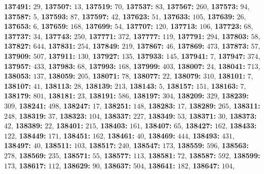 \textsf{\bfseries 137491:} $29$, \textsf{\bfseries 137507:} $13$, \textsf{\bfseries 137519:} $70$, \textsf{\bfseries 137537:} $83$, \textsf{\bfseries 137567:} $260$, \textsf{\bfseries 137573:} $94$, \textsf{\bfseries 137587:} $5$, \textsf{\bfseries 137593:} $87$, \textsf{\bfseries 137597:} $42$, \textsf{\bfseries 137623:} $51$, \textsf{\bfseries 137633:} $105$, \textsf{\bfseries 137639:} $26$, \textsf{\bfseries 137653:} $6$, \textsf{\bfseries 137659:} $168$, \textsf{\bfseries 137699:} $54$, \textsf{\bfseries 137707:} $120$, \textsf{\bfseries 137713:} $106$, \textsf{\bfseries 137723:} $68$, \textsf{\bfseries 137737:} $34$, \textsf{\bfseries 137743:} $250$, \textsf{\bfseries 137771:} $372$, \textsf{\bfseries 137777:} $119$, \textsf{\bfseries 137791:} $294$, \textsf{\bfseries 137803:} $58$, \textsf{\bfseries 137827:} $644$, \textsf{\bfseries 137831:} $254$, \textsf{\bfseries 137849:} $219$, \textsf{\bfseries 137867:} $46$, \textsf{\bfseries 137869:} $473$, \textsf{\bfseries 137873:} $57$, \textsf{\bfseries 137909:} $507$, \textsf{\bfseries 137911:} $130$, \textsf{\bfseries 137927:} $135$, \textsf{\bfseries 137933:} $145$, \textsf{\bfseries 137941:} $7$, \textsf{\bfseries 137947:} $374$, \textsf{\bfseries 137957:} $433$, \textsf{\bfseries 137983:} $68$, \textsf{\bfseries 137993:} $168$, \textsf{\bfseries 137999:} $403$, \textsf{\bfseries 138007:} $24$, \textsf{\bfseries 138041:} $713$, \textsf{\bfseries 138053:} $137$, \textsf{\bfseries 138059:} $205$, \textsf{\bfseries 138071:} $78$, \textsf{\bfseries 138077:} $22$, \textsf{\bfseries 138079:} $310$, \textsf{\bfseries 138101:} $7$, \textsf{\bfseries 138107:} $41$, \textsf{\bfseries 138113:} $28$, \textsf{\bfseries 138139:} $213$, \textsf{\bfseries 138143:} $5$, \textsf{\bfseries 138157:} $151$, \textsf{\bfseries 138163:} $7$, \textsf{\bfseries 138179:} $801$, \textsf{\bfseries 138181:} $23$, \textsf{\bfseries 138191:} $586$, \textsf{\bfseries 138197:} $304$, \textsf{\bfseries 138209:} $329$, \textsf{\bfseries 138239:} $309$, \textsf{\bfseries 138241:} $498$, \textsf{\bfseries 138247:} $17$, \textsf{\bfseries 138251:} $148$, \textsf{\bfseries 138283:} $17$, \textsf{\bfseries 138289:} $265$, \textsf{\bfseries 138311:} $248$, \textsf{\bfseries 138319:} $37$, \textsf{\bfseries 138323:} $104$, \textsf{\bfseries 138337:} $227$, \textsf{\bfseries 138349:} $53$, \textsf{\bfseries 138371:} $30$, \textsf{\bfseries 138373:} $42$, \textsf{\bfseries 138389:} $22$, \textsf{\bfseries 138401:} $215$, \textsf{\bfseries 138403:} $161$, \textsf{\bfseries 138407:} $65$, \textsf{\bfseries 138427:} $162$, \textsf{\bfseries 138433:} $122$, \textsf{\bfseries 138449:} $171$, \textsf{\bfseries 138451:} $162$, \textsf{\bfseries 138461:} $40$, \textsf{\bfseries 138469:} $444$, \textsf{\bfseries 138493:} $431$, \textsf{\bfseries 138497:} $40$, \textsf{\bfseries 138511:} $103$, \textsf{\bfseries 138517:} $240$, \textsf{\bfseries 138547:} $173$, \textsf{\bfseries 138559:} $596$, \textsf{\bfseries 138563:} $278$, \textsf{\bfseries 138569:} $235$, \textsf{\bfseries 138571:} $55$, \textsf{\bfseries 138577:} $113$, \textsf{\bfseries 138581:} $72$, \textsf{\bfseries 138587:} $592$, \textsf{\bfseries 138599:} $173$, \textsf{\bfseries 138617:} $112$, \textsf{\bfseries 138629:} $90$, \textsf{\bfseries 138637:} $504$, \textsf{\bfseries 138641:} $182$, \textsf{\bfseries 138647:} $104$, 
